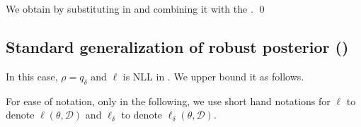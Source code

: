 We obtain  by substituting  in  and combining it with the .
\qed

\subsection{Standard generalization of robust posterior (\MakeLowercase{)}}

In this case, $\rho = q_\delta$ and $\ell$ is NLL in . We upper bound it as follows.

For ease of notation, only in the following, we use short hand notations for $\ell$ to denote $\ell(\theta, \mathcal{D})$ and $\ell_{\delta}$ to denote $\ell_{\delta}(\theta, \mathcal{D})$.

